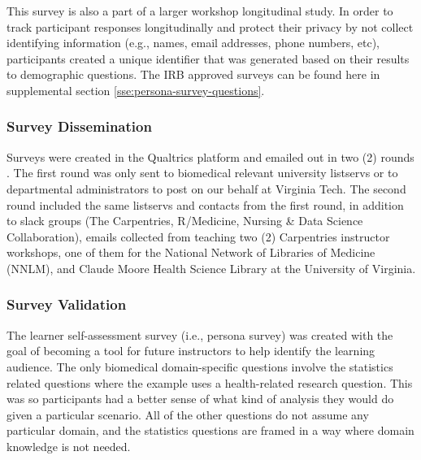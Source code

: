 \documentclass[020-persona\_validation.tex]{subfiles}
\begin{document}
            This survey is also a part of a larger workshop longitudinal study.
            In order to track participant responses longitudinally and protect their privacy by not collect identifying information
            (e.g., names, email addresses, phone numbers, etc),
            participants created a unique identifier that was generated based on their results to demographic questions.
            The IRB approved surveys can be found here in supplemental section \ref{sse:persona-survey-questions}.

        \subsubsection{Survey Dissemination}

            Surveys were created in the Qualtrics platform and emailed out in two (2) rounds
            \cite{Qualtrics2005}.
            The first round was only sent to biomedical relevant university listservs
            or to departmental administrators to post on our behalf at Virginia Tech.
            The second round included the same listservs and contacts from the first round,
            in addition to slack groups (The Carpentries, R/Medicine, Nursing \& Data Science Collaboration),
            emails collected from teaching two (2) Carpentries instructor workshops,
            one of them for the National Network of Libraries of Medicine (NNLM),
            and
            Claude Moore Health Science Library at the University of Virginia.

        \subsubsection{Survey Validation}

            The learner self-assessment survey (i.e., persona survey)
            was created with the goal of becoming a tool for future instructors
            to help identify the learning audience.
            The only biomedical domain-specific questions involve the statistics related questions
            where the example uses a health-related research question.
            This was so participants had a better sense of what kind of analysis they would do given a particular scenario.
            All of the other questions do not assume any particular domain,
            and the statistics questions are framed in a way where domain knowledge is not needed.
\end{document}
